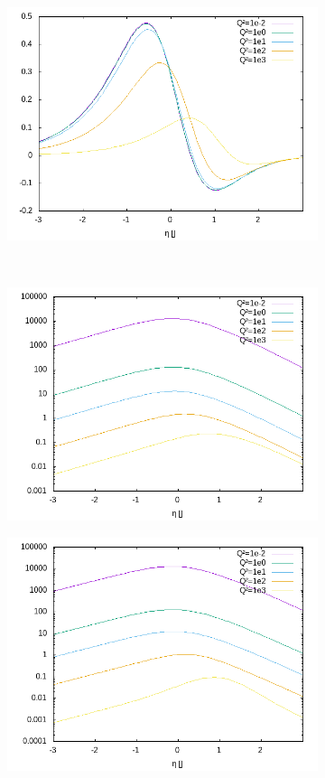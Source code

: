 \begin{figure}[ht!]
\begin{subfigure}[t]{.3\textwidth}
	\includegraphics[width=\textwidth]{../../img2/partonic/cg0_VV_x2g1}
\end{subfigure}\\%
\begin{subfigure}[t]{.3\textwidth}
	\includegraphics[width=\textwidth]{../../img2/partonic/cg0_AA_F2}
\end{subfigure}%
\begin{subfigure}[t]{.3\textwidth}
	\includegraphics[width=\textwidth]{../../img2/partonic/cg0_AA_FL}

\end{subfigure}
\end{figure}
